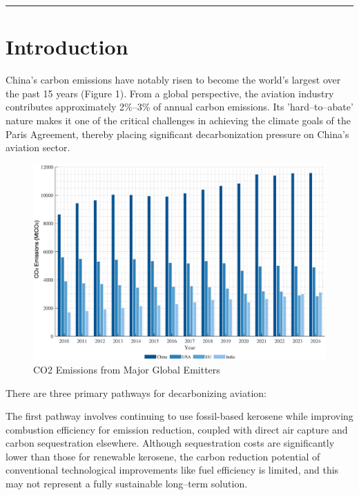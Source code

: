 \documentclass[a4paper,11pt]{article}
\begin{document}
\vspace{1em}
\hrule
\vspace{1.5em}



\section{Introduction}
China's carbon emissions have notably risen to become the world's largest over the past 15 years (Figure 1). From a global perspective, the aviation industry contributes approximately 2\%--3\% of annual carbon emissions. Its 'hard--to--abate' nature makes it one of the critical challenges in achieving the climate goals of the Paris Agreement, thereby placing significant decarbonization pressure on China's aviation sector.



\begin{figure}[htbp]
    \centering
    \includegraphics[width=0.9\linewidth]{global_co2_emissions.eps}
    \caption{CO2 Emissions from Major Global Emitters}
    \label{fig:co2_emissions}
\end{figure}


There are three primary pathways for decarbonizing aviation:

The first pathway involves continuing to use fossil-based kerosene while improving combustion efficiency for emission reduction, coupled with direct air capture and carbon sequestration elsewhere. Although sequestration costs are significantly lower than those for renewable kerosene, the carbon reduction potential of conventional technological improvements like fuel efficiency is limited, and this may not represent a fully sustainable long--term solution.
\end{document}
